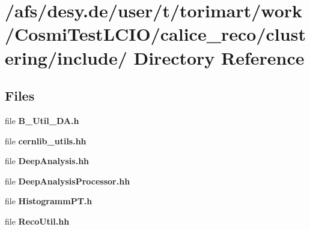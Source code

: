 \section{/afs/desy.de/user/t/torimart/work/CosmiTestLCIO/calice\_\-reco/clustering/include/ Directory Reference}
\label{dir_3d67f82afc17f026a273bfc7062c407a}
\subsection*{Files}
\begin{DoxyCompactItemize}
\item 
file {\bfseries B\_\-Util\_\-DA.h}
\item 
file {\bfseries cernlib\_\-utils.hh}
\item 
file {\bfseries DeepAnalysis.hh}
\item 
file {\bfseries DeepAnalysisProcessor.hh}
\item 
file {\bfseries HistogrammPT.h}
\item 
file {\bfseries RecoUtil.hh}
\end{DoxyCompactItemize}
